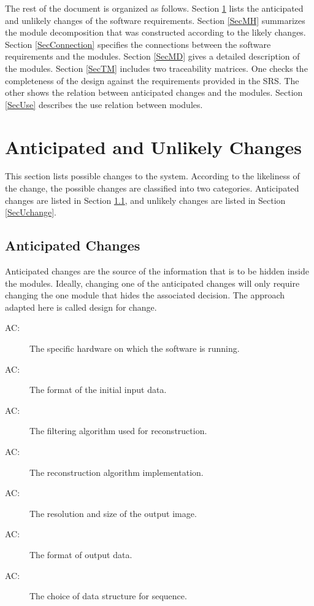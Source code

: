 \documentclass[12pt, titlepage]{article}
\newcounter{acnum}
\newcommand{\actheacnum}{AC\theacnum}
\begin{document}
The rest of the document is organized as follows. Section
\ref{SecChange} lists the anticipated and unlikely changes of the software
requirements. Section \ref{SecMH} summarizes the module decomposition that
was constructed according to the likely changes. Section \ref{SecConnection}
specifies the connections between the software requirements and the
modules. Section \ref{SecMD} gives a detailed description of the
modules. Section \ref{SecTM} includes two traceability matrices. One checks
the completeness of the design against the requirements provided in the SRS. The
other shows the relation between anticipated changes and the modules. Section
\ref{SecUse} describes the use relation between modules.

\section{Anticipated and Unlikely Changes} \label{SecChange}

This section lists possible changes to the system. According to the likeliness
of the change, the possible changes are classified into two
categories. Anticipated changes are listed in Section \ref{SecAchange}, and
unlikely changes are listed in Section \ref{SecUchange}.

\subsection{Anticipated Changes} \label{SecAchange}

Anticipated changes are the source of the information that is to be hidden
inside the modules. Ideally, changing one of the anticipated changes will only
require changing the one module that hides the associated decision. The approach
adapted here is called design for
change.

\begin{description}
\item[ \actheacnum \label{acHardware}:] The specific
  hardware on which the software is running.
\item[ \actheacnum \label{acInput}:] The format of the
  initial input data.
\item [ \actheacnum \label{acFilter}:] The filtering
  algorithm used for reconstruction.
\item [ \actheacnum \label{acAlgo}:] The reconstruction
  algorithm implementation.
\item [ \actheacnum \label{acResolution}:] The resolution and
  size of the output image.
\item [ \actheacnum \label{acOutput}:] The format of output
  data.
\item [ \actheacnum \label{acData}:] The choice of data
  structure for sequence.
\end{description}
\end{document}
